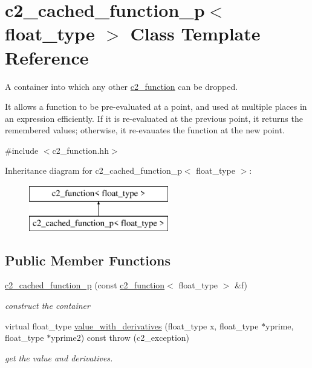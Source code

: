 \hypertarget{classc2__cached__function__p}{\section{c2\-\_\-cached\-\_\-function\-\_\-p$<$ float\-\_\-type $>$ Class Template Reference}
\label{classc2__cached__function__p}
}


A container into which any other \hyperlink{classc2__function}{c2\-\_\-function} can be dropped.

It allows a function to be pre-\/evaluated at a point, and used at multiple places in an expression efficiently. If it is re-\/evaluated at the previous point, it returns the remembered values; otherwise, it re-\/evauates the function at the new point.  




{\ttfamily \#include $<$c2\-\_\-function.\-hh$>$}

Inheritance diagram for c2\-\_\-cached\-\_\-function\-\_\-p$<$ float\-\_\-type $>$\-:\begin{figure}[H]
\begin{center}
\leavevmode
\includegraphics[height=2.000000cm]{classc2__cached__function__p}
\end{center}
\end{figure}
\subsection*{Public Member Functions}
\begin{DoxyCompactItemize}
\item 
\hyperlink{classc2__cached__function__p_aac798ef75eb219dbf64a35fed575f217}{c2\-\_\-cached\-\_\-function\-\_\-p} (const \hyperlink{classc2__function}{c2\-\_\-function}$<$ float\-\_\-type $>$ \&f)
\begin{DoxyCompactList}\small\item\em construct the container \end{DoxyCompactList}\item 
virtual float\-\_\-type \hyperlink{classc2__cached__function__p_a09f22efcdcf81c1a7b353d10e29b193c}{value\-\_\-with\-\_\-derivatives} (float\-\_\-type x, float\-\_\-type $\ast$yprime, float\-\_\-type $\ast$yprime2) const   throw (c2\-\_\-exception)
\begin{DoxyCompactList}\small\item\em get the value and derivatives. \end{DoxyCompactList}\end{DoxyCompactItemize}
